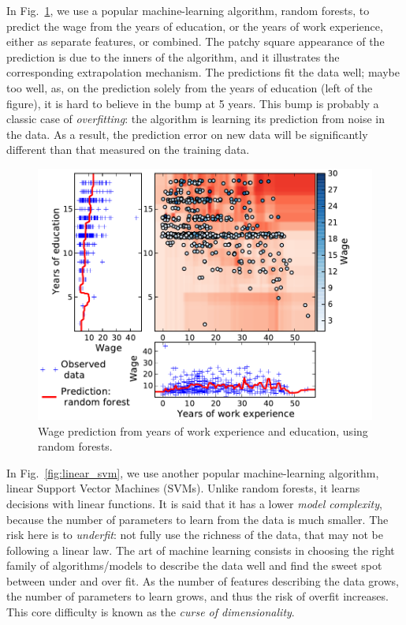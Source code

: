 \documentclass[a4paper]{article}
\begin{document}
In Fig.~\ref{fig:random_forest}, we use a popular machine-learning
algorithm, random forests, to predict the wage from the years of
education, or the years of work experience, either as separate features,
or combined. The patchy square appearance of the prediction is due to the
inners of the algorithm, and it illustrates the corresponding
extrapolation mechanism. The predictions fit the data well; maybe too
well, as, on the prediction solely from the years of education (left of
the figure), it is hard to believe in the bump at 5 years. This bump is
probably a classic case of \emph{overfitting}: the algorithm is learning its
prediction from noise in the data. As a result, the prediction error on
new data will be significantly different than that measured on the
training data.

\begin{figure}[b]
    \includegraphics[width=1.05\linewidth]{wage_data_random_forest}%

    \caption{Wage prediction from years of work experience and education,
    using random forests.\label{fig:random_forest}}
\end{figure}


In Fig.~\ref{fig:linear_svm}, we use another popular machine-learning
algorithm, linear Support Vector Machines (SVMs). Unlike random forests,
it learns decisions with linear functions. It is said that
it has a lower \emph{model complexity}, because the number of parameters
to learn from the data is much smaller. The risk here is to
\emph{underfit}: not fully use the richness of the data, that may not be
following a linear law. The art of machine learning consists in choosing
the right family of algorithms/models to describe the data well and
find the sweet spot between under and over fit. As the number of features
describing the data grows, the number of parameters to learn grows, and
thus the risk of overfit increases. This core difficulty is known as the
\emph{curse of dimensionality}.
\end{document}
